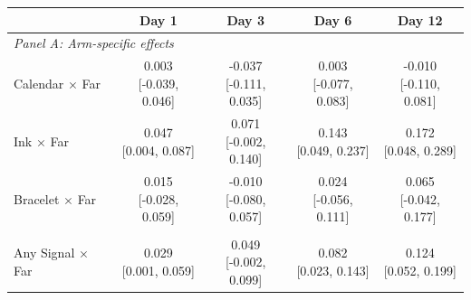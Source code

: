 \begin{tabular}{lcccc}
\toprule
 & Day 1 & Day 3 & Day 6 & Day 12 \\
\midrule
\multicolumn{5}{l}{\textit{Panel A: Arm-specific effects}} \\
Calendar $\times$ Far & \makecell[c]{0.003\\{[-0.039, 0.046]}} & \makecell[c]{-0.037\\{[-0.111, 0.035]}} & \makecell[c]{0.003\\{[-0.077, 0.083]}} & \makecell[c]{-0.010\\{[-0.110, 0.081]}} \\
Ink $\times$ Far & \makecell[c]{0.047\\{[0.004, 0.087]}} & \makecell[c]{0.071\\{[-0.002, 0.140]}} & \makecell[c]{0.143\\{[0.049, 0.237]}} & \makecell[c]{0.172\\{[0.048, 0.289]}} \\
Bracelet $\times$ Far & \makecell[c]{0.015\\{[-0.028, 0.059]}} & \makecell[c]{-0.010\\{[-0.080, 0.057]}} & \makecell[c]{0.024\\{[-0.056, 0.111]}} & \makecell[c]{0.065\\{[-0.042, 0.177]}} \\
\addlinespace
\multicolumn{5}{l}{\textit{Panel B: Pooled signal effect}} \\
Any Signal $\times$ Far & \makecell[c]{0.029\\{[0.001, 0.059]}} & \makecell[c]{0.049\\{[-0.002, 0.099]}} & \makecell[c]{0.082\\{[0.023, 0.143]}} & \makecell[c]{0.124\\{[0.052, 0.199]}} \\
\bottomrule
\end{tabular}
